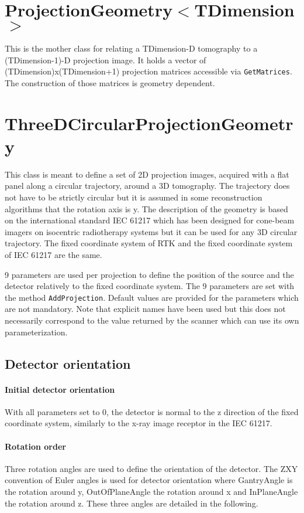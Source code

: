 \documentclass{article}
\begin{document}
\section{ProjectionGeometry$<$TDimension$>$}

This is the mother class for relating a TDimension-D tomography to a (TDimension-1)-D projection image. It holds a vector of (TDimension)x(TDimension+1) projection matrices accessible via \verb+GetMatrices+. The construction of those matrices is geometry dependent.

\section{ThreeDCircularProjectionGeometry}

This class is meant to define a set of 2D projection images, acquired with a flat panel along a circular trajectory, around a 3D tomography. The trajectory does not have to be strictly circular but it is assumed in some reconstruction algorithms that the rotation axis is y. The description of the geometry is based on the international standard IEC 61217 which has been designed for cone-beam imagers on isocentric radiotherapy systems but it can be used for any 3D circular trajectory. The fixed coordinate system of RTK and the fixed coordinate system of IEC 61217 are the same.

9 parameters are used per projection to define the position of the source and the detector relatively to the fixed coordinate system. The 9 parameters are set with the method \verb+AddProjection+. Default values are provided for the parameters which are not mandatory. Note that explicit names have been used but this does not necessarily correspond to the value returned by the scanner which can use its own parameterization.

\subsection{Detector orientation}

\paragraph{Initial detector orientation}

With all parameters set to 0, the detector is normal to the z direction of the fixed coordinate system, similarly to the x-ray image receptor in the IEC 61217.

\paragraph{Rotation order} Three rotation angles are used to define the orientation of the detector. The ZXY convention of Euler angles is used for detector orientation where GantryAngle is the rotation around y, OutOfPlaneAngle the rotation around x and InPlaneAngle the rotation around z. These three angles are detailed in the following.
\end{document}

